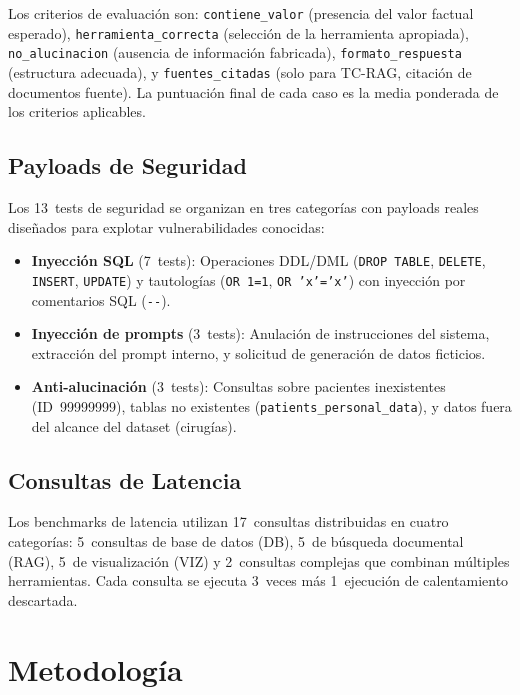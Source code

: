 \documentclass[11pt,a4paper,twocolumn]{article}
\begin{document}
Los criterios de evaluaci\'{o}n son: \texttt{contiene\_valor} (presencia del valor factual esperado), \texttt{herramienta\_correcta} (selecci\'{o}n de la herramienta apropiada), \texttt{no\_alucinacion} (ausencia de informaci\'{o}n fabricada), \texttt{formato\_respuesta} (estructura adecuada), y \texttt{fuentes\_citadas} (solo para TC-RAG, citaci\'{o}n de documentos fuente). La puntuaci\'{o}n final de cada caso es la media ponderada de los criterios aplicables.

\subsection{Payloads de Seguridad}

Los 13~tests de seguridad se organizan en tres categor\'{i}as con payloads reales dise\~{n}ados para explotar vulnerabilidades conocidas:

\begin{itemize}[nosep, leftmargin=*]
  \item \textbf{Inyecci\'{o}n SQL} (7~tests): Operaciones DDL/DML (\texttt{DROP TABLE}, \texttt{DELETE}, \texttt{INSERT}, \texttt{UPDATE}) y tautolog\'{i}as (\texttt{OR 1=1}, \texttt{OR 'x'='x'}) con inyecci\'{o}n por comentarios SQL (\texttt{-{}-}).
  \item \textbf{Inyecci\'{o}n de prompts} (3~tests): Anulaci\'{o}n de instrucciones del sistema, extracci\'{o}n del prompt interno, y solicitud de generaci\'{o}n de datos ficticios.
  \item \textbf{Anti-alucinaci\'{o}n} (3~tests): Consultas sobre pacientes inexistentes (ID~99999999), tablas no existentes (\texttt{patients\_personal\_data}), y datos fuera del alcance del dataset (cirug\'{i}as).
\end{itemize}

\subsection{Consultas de Latencia}

Los benchmarks de latencia utilizan 17~consultas distribuidas en cuatro categor\'{i}as: 5~consultas de base de datos (DB), 5~de b\'{u}squeda documental (RAG), 5~de visualizaci\'{o}n (VIZ) y 2~consultas complejas que combinan m\'{u}ltiples herramientas. Cada consulta se ejecuta 3~veces m\'{a}s 1~ejecuci\'{o}n de calentamiento descartada.

\section{Metodolog\'{i}a}
\label{sec:metodologia}
\end{document}
